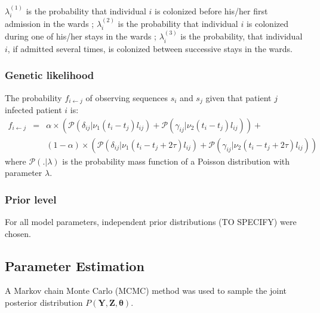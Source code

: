 \documentclass[10pt]{article}
\begin{document}
\noindent $\lambda_i^{\left(1\right)}$ is the probability that individual $i$ is colonized before his/her first admission in the wards ; $\lambda_i^{\left(2\right)}$ is the probability that individual $i$ is colonized during one of his/her stays in the wards ; $\lambda_i^{\left(3\right)}$ is the probability, that individual $i$, if admitted several times, is colonized between successive stays in the wards.





\subsubsection*{Genetic likelihood}


The probability $f_{i \leftarrow j}$ of observing sequences $s_i$ and $s_j$ given that patient $j$ infected patient $i$ is:
\begin{eqnarray*}
f_{i \leftarrow j} & = & \alpha \times \left( \mathcal{P}(\delta_{ij} | \nu_1 (t_i-t_j) l_{ij}) 
  + \mathcal{P}(\gamma_{ij} | \nu_2 (t_i-t_j) l_{ij}) \right) + \\
& & (1-\alpha) \times \left( \mathcal{P}(\delta_{ij} | \nu_1 (t_i-t_j + 2\tau) l_{ij}) + \mathcal{P}(\gamma_{ij} | \nu_2 (t_i-t_j+ 2\tau) l_{ij}) \right)
\end{eqnarray*}
where $\mathcal{P}(.|\lambda)$ is the probability mass function of a Poisson distribution with parameter $\lambda$.





\subsubsection*{Prior level}


For all model parameters, independent prior distributions (TO SPECIFY) were chosen. 
  
\subsection*{Parameter Estimation}

A Markov chain Monte Carlo (MCMC) method was used to sample the joint
posterior distribution $P\left(\bm{Y},\bm{Z},\bm{\theta}\right)$.
\end{document}
